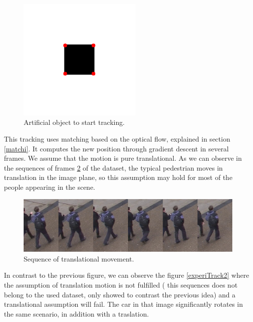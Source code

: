 \begin{figure}[H]
\centering         
\includegraphics[width=6cm]{tracker/scale1points.png}
\caption{Artificial object to start tracking.} \label{trs}
\end{figure}






This tracking uses matching based on the optical flow, explained in section \ref{matchi}. It computes the new position through gradient descent in several frames. We assume that the motion is pure translational. As we can observe in the sequences of frames \ref{experiTrack1} of the dataset, the typical pedestrian moves in translation in the image plane, so this assumption may hold for most of the people appearing in the scene.

\begin{figure}[H]
\centering         
\includegraphics[width=0.9\linewidth]{changeCamera/trrasls.png}
\caption{Sequence of translational movement.} \label{experiTrack1}
\end{figure}

In contrast to the previous figure, we can observe the figure \ref{experiTrack2} where the assumption of translation motion is not fulfilled ( this sequences does not belong to the used dataset, only showed to contrast the previous idea) and a translational assumption will fail. The car in that image significantly rotates in the same scenario, in addition with a traslation.

